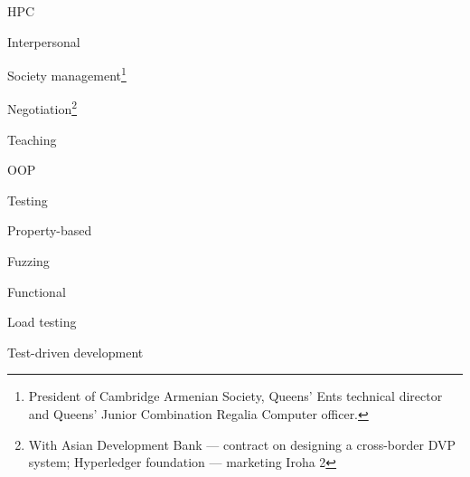 \documentclass{CurriculumVitae}[10pt, condensed]
\begin{document}
\begin{multicols}{4}
    \begin{skills}{HPC}
    \item {}
    \item {}
    \item {}
    \end{skills}

    \begin{skills}{Interpersonal}
    \item Society management\footnote{President of Cambridge Armenian
        Society, Queens' Ents technical director and Queens' Junior
        Combination Regalia Computer officer. }
    \item Negotiation\footnote{With Asian Development Bank ---
        contract on designing a cross-border DVP system; Hyperledger
        foundation ---  marketing Iroha 2}
    \item Teaching
    \end{skills}

    \begin{skills}{OOP}
    \item {}
    \item {}
    \item {}
    \end{skills}


    \begin{skills}{Testing}
    \item {\footnotesize Property-based}
    \item {\footnotesize Fuzzing}
    \item {\footnotesize Functional}
    \item {\footnotesize Load testing}
    \item {\footnotesize Test-driven development}
    \end{skills}
\begin{comment}
  \begin{skills}{Other Languages}
  \item \term{Python}
  \item \term{Bash}
  \item \term{Elisp}
  \end{skills}
\end{comment}
\begin{comment}
  \begin{skills}{OS/Containers}
  \item \term{NixOS}
  \item \term{Linux}\footnote{Mainly Arch-based, but with experience
      of deploying Alpine based containers and static linking}
  \item \term{BSD}
  \item \term{Mac OS X}\footnote{With low-level API knowledge for
      mouse tracking, key-logging, SIP circumvention}
  \end{skills}
\end{comment}
  \end{multicols}
\vfill




\vfill
\end{document}
